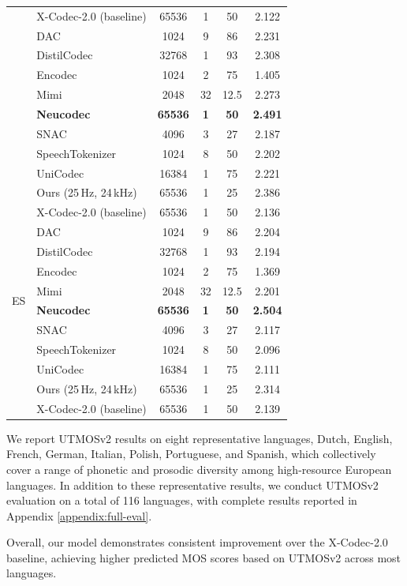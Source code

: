 \documentclass[preprint]{article}
\begin{document}
\begin{longtable}{llcccc}
  & X-Codec-2.0 (baseline) & 65536 & 1 & 50 & 2.122 \\
\pagebreak
\multirow{8}{*}{PT}
  & DAC & 1024 & 9 & 86 & 2.231 \\
  & DistilCodec & 32768 & 1 & 93 & 2.308 \\
  & Encodec & 1024 & 2 & 75 & 1.405 \\
  & Mimi & 2048 & 32 & 12.5 & 2.273 \\
  & \textbf{Neucodec} & \textbf{65536} & \textbf{1} & \textbf{50} & \textbf{2.491} \\
  & SNAC & 4096 & 3 & 27 & 2.187 \\
  & SpeechTokenizer & 1024 & 8 & 50 & 2.202 \\
  & UniCodec & 16384 & 1 & 75 & 2.221 \\
  & Ours (25\,Hz, 24\,kHz) & 65536 & 1 & 25 & 2.386 \\
  & X-Codec-2.0 (baseline) & 65536 & 1 & 50 & 2.136 \\
\midrule
\multirow{8}{*}{ES}
  & DAC & 1024 & 9 & 86 & 2.204 \\
  & DistilCodec & 32768 & 1 & 93 & 2.194 \\
  & Encodec & 1024 & 2 & 75 & 1.369 \\
  & Mimi & 2048 & 32 & 12.5 & 2.201 \\
  & \textbf{Neucodec} & \textbf{65536} & \textbf{1} & \textbf{50} & \textbf{2.504} \\
  & SNAC & 4096 & 3 & 27 & 2.117 \\
  & SpeechTokenizer & 1024 & 8 & 50 & 2.096 \\
  & UniCodec & 16384 & 1 & 75 & 2.111 \\
  & Ours (25\,Hz, 24\,kHz) & 65536 & 1 & 25 & 2.314 \\
  & X-Codec-2.0 (baseline) & 65536 & 1 & 50 & 2.139 \\
\end{longtable}

We report UTMOSv2 results on eight representative languages, Dutch, English, French, German, Italian, Polish, Portuguese, and Spanish, which collectively cover a range of phonetic and prosodic diversity among high-resource European languages. In addition to these representative results, we conduct UTMOSv2 evaluation on a total of 116 languages, with complete results reported in Appendix \ref{appendix:full-eval}.

Overall, our model demonstrates consistent improvement over the X-Codec-2.0 baseline, achieving higher predicted MOS scores based on UTMOSv2 across most languages.
\end{document}
